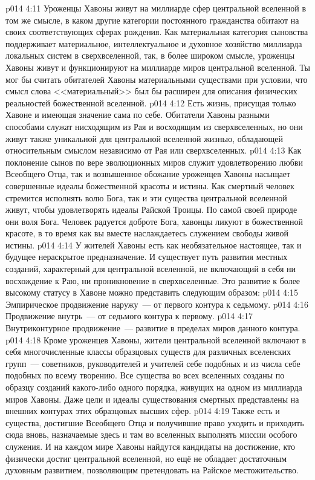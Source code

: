\vs p014 4:11 Уроженцы Хавоны живут на миллиарде сфер центральной вселенной в том же смысле, в каком другие категории постоянного гражданства обитают на своих соответствующих сферах рождения. Как материальная категория сыновства поддерживает материальное, интеллектуальное и духовное хозяйство миллиарда локальных систем в сверхвселенной, так, в более широком смысле, уроженцы Хавоны живут и функционируют на миллиарде миров центральной вселенной. Ты мог бы считать обитателей Хавоны материальными существами при условии, что смысл слова <<материальный>> был бы расширен для описания физических реальностей божественной вселенной.
\vs p014 4:12 Есть жизнь, присущая только Хавоне и имеющая значение сама по себе. Обитатели Хавоны разными способами служат нисходящим из Рая и восходящим из сверхвселенных, но они живут также уникальной для центральной вселенной жизнью, обладающей относительным смыслом независимо от Рая или сверхвселенных.
\vs p014 4:13 Как поклонение сынов по вере эволюционных миров служит удовлетворению любви Всеобщего Отца, так и возвышенное обожание уроженцев Хавоны насыщает совершенные идеалы божественной красоты и истины. Как смертный человек стремится исполнять волю Бога, так и эти существа центральной вселенной живут, чтобы удовлетворять идеалы Райской Троицы. По самой своей природе они  воля Бога. Человек радуется доброте Бога, хавонцы ликуют в божественной красоте, в то время как вы вместе наслаждаетесь служением свободы живой истины.
\vs p014 4:14 У жителей Хавоны есть как необязательное настоящее, так и будущее нераскрытое предназначение. И существует путь развития местных созданий, характерный для центральной вселенной, не включающий в себя ни восхождение к Раю, ни проникновение в сверхвселенные. Это развитие к более высокому статусу в Хавоне можно представить следующим образом:
\vs p014 4:15 Эмпирическое продвижение наружу~--- от первого контура к седьмому.
\vs p014 4:16 Продвижение внутрь~--- от седьмого контура к первому.
\vs p014 4:17 Внутриконтурное продвижение~--- развитие в пределах миров данного контура.
\vs p014 4:18 \pc Кроме уроженцев Хавоны, жители центральной вселенной включают в себя многочисленные классы образцовых существ для различных вселенских групп~--- советников, руководителей и учителей себе подобных и из числа себе подобных по всему творению. Все существа во всех вселенных созданы по образцу созданий какого\hyp{}либо одного порядка, живущих на одном из миллиарда миров Хавоны. Даже цели и идеалы существования смертных представлены на внешних контурах этих образцовых высших сфер.
\vs p014 4:19 Также есть и существа, достигшие Всеобщего Отца и получившие право уходить и приходить сюда вновь, назначаемые здесь и там во вселенных выполнять миссии особого служения. И на каждом мире Хавоны найдутся кандидаты на достижение, кто физически достиг центральной вселенной, но ещё не обладает достаточным духовным развитием, позволяющим претендовать на Райское местожительство.
